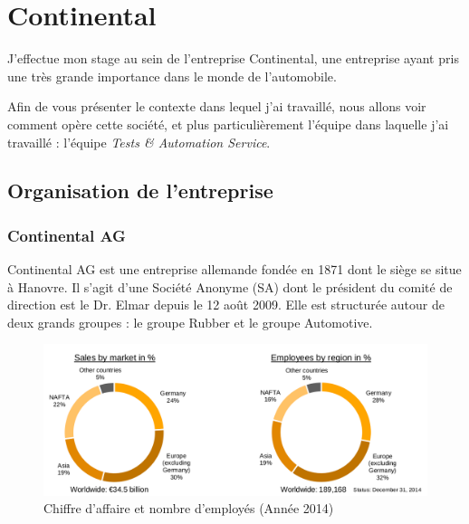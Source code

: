 \chapter{Continental}\label{chapConti}
\putminitoc
J'effectue mon stage au sein de l'entreprise Continental, une entreprise ayant pris une très grande importance dans le monde de l'automobile. 

Afin de vous présenter le contexte dans lequel j'ai travaillé, nous allons voir comment opère cette société, et plus particulièrement l'équipe dans laquelle j'ai travaillé : l'équipe \textit{Tests \& Automation Service}.

	\section{Organisation de l'entreprise}
		\subsection{Continental AG}

Continental AG est une entreprise allemande fondée en 1871 dont le siège se situe à Hanovre. Il s'agit d'une Société Anonyme (SA) dont le président du comité de
direction est le Dr. Elmar  depuis le 12 août 2009. Elle est structurée autour de deux grands groupes : le groupe Rubber et le groupe Automotive.
	 
		 \begin{figure}[H]
		 	\centering
		 	\includegraphics[width=19cm]{contents/images/caConti.png}
		 	\caption{Chiffre d'affaire et nombre d'employés (Année 2014)}
		 	\label{fig:caConti}
		 \end{figure}

